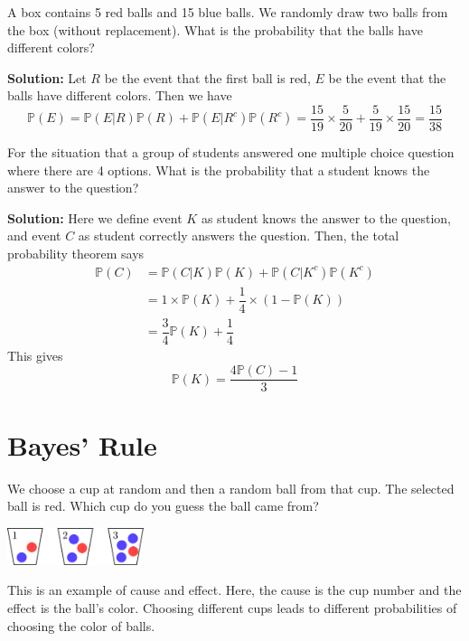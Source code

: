 \begin{eg}
    A box contains 5 red balls and 15 blue balls. We randomly draw two balls from the box (without replacement). What is the probability that the balls have different colors?

    \textbf{Solution:} 
    Let \(R\) be the event that the first ball is red, \(E\) be the event that the balls have different colors. Then we have 
    \[
        \mathbb{P}(E) = \mathbb{P}(E \vert R)\mathbb{P}(R) + \mathbb{P}(E \vert R^c)\mathbb{P}(R^c) = \dfrac{15}{19} \times \dfrac{5}{20} + \dfrac{5}{19} \times \dfrac{15}{20} = \dfrac{15}{38}
    \]
\end{eg}

\begin{eg}
    For the situation that a group of students answered one multiple choice question where there are 4 options. What is the probability that a student knows the answer to the question?

    \textbf{Solution:} 
    Here we define event \(K\) as student knows the answer to the question, and event \(C\) as student correctly answers the question. Then, the total probability theorem says 
    \[
        \begin{aligned}
            \mathbb{P}(C) &= \mathbb{P}(C \vert K)\mathbb{P}(K) + \mathbb{P}(C \vert K^c)\mathbb{P}(K^c) \\
            &= 1 \times \mathbb{P}(K) + \dfrac{1}{4} \times (1 - \mathbb{P}(K)) \\
            &= \dfrac{3}{4}\mathbb{P}(K) + \dfrac{1}{4}
        \end{aligned}
    \]
    This gives 
    \[
        \mathbb{P}(K) = \dfrac{4\mathbb{P}(C) - 1}{3}
    \]
\end{eg}

\newpage
\section{Bayes' Rule}
We choose a cup at random and then a random ball from that cup. The selected ball is red. Which cup do you guess the ball came from? 
\begin{center}
    \includegraphics[width=0.3\textwidth]{Figures/EgCup.pdf}
\end{center}
This is an example of cause and effect. Here, the cause is the cup number and the effect is the ball's color. Choosing different cups leads to different probabilities of choosing the color of balls.

